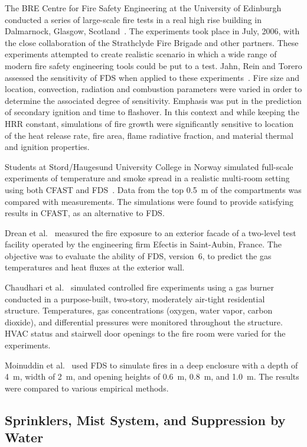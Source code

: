 The BRE Centre for Fire Safety Engineering at the University of Edinburgh conducted a series of large-scale fire tests in a real high rise building in Dalmarnock, Glasgow,
Scotland~\cite{Rein:Dalmarnock,Rein:FSJ}.
The experiments took place in July, 2006, with the close collaboration of the Strathclyde Fire Brigade and other partners.
These experiments attempted to create realistic scenario in which a wide range of modern fire safety engineering tools could be put to a test.
Jahn, Rein and Torero assessed the sensitivity of FDS when applied to these experiments~\cite{Jahn:IAFSS9}. Fire size and
location, convection, radiation and combustion parameters were varied in order to determine the associated
degree of sensitivity. Emphasis was put in the prediction of secondary ignition and time to flashover. In this
context and while keeping the HRR constant, simulations of fire growth were significantly sensitive to
location of the heat release rate, fire area, flame radiative fraction, and material thermal and ignition
properties.

Students at Stord/Haugesund University College in Norway simulated full-scale experiments of temperature and smoke spread in a
realistic multi-room setting using both CFAST and FDS~\cite{Storm:thesis}. Data from the top 0.5~m of the compartments was compared with measurements.
The simulations were found to provide satisfying results in CFAST, as an alternative to FDS.

Drean et al.~\cite{Drean2018} measured the fire exposure to an exterior facade of a two-level test facility operated by the engineering firm Efectis in Saint-Aubin, France. The objective was to evaluate the ability of FDS, version~6, to predict the gas temperatures and heat fluxes at the exterior wall.

Chaudhari et al.~\cite{Chaudhari:FT2023} simulated controlled fire experiments using a gas burner conducted in a purpose-built, two-story, moderately air-tight residential structure. Temperatures, gas concentrations (oxygen, water vapor, carbon dioxide), and differential pressures were monitored throughout the structure. HVAC status and stairwell door openings to the fire room were varied for the experiments.

Moinuddin et al.~\cite{Moinuddin:FM2017} used FDS to simulate fires in a deep enclosure with a depth of 4~m, width of 2~m, and opening heights of 0.6~m, 0.8~m, and 1.0~m. The results were compared to various empirical methods.


\subsection{Sprinklers, Mist System, and Suppression by Water}

